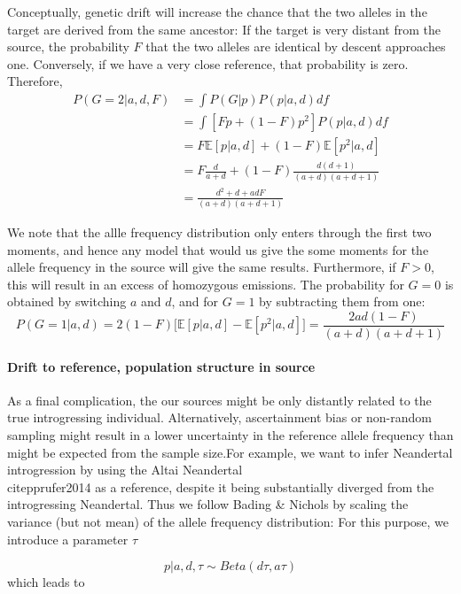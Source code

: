 \documentclass[10pt,a4paper]{article}
\newcommand{\BE}[1]{\mathbb{E}\left[#1\right]}
\begin{document}
Conceptually, genetic drift will increase the chance that the two alleles in the target are derived from the same ancestor: If the target is very distant from the source, the probability $F$ that the two alleles are identical by descent approaches one.  Conversely, if we have a very close reference, that probability is zero. Therefore,
\begin{align}
P(G=2 | a,d, F) &= \int P(G|p) P(p | a, d) df \nonumber\\
&= \int \left[ F p + (1-F) p^2\right] P(p | a, d) df\nonumber\\
&= F \BE{p|a, d} + (1-F)  \BE{p^2|a, d}\label{eq:pg}\\
&= F \frac{d}{a+d} + (1-F)  \frac{d (d+1)}{(a+d)(a+d+1)}\nonumber\\
&= \frac{d^2 + d + adF}{(a+d)(a+d+1)}
\end{align}


We note that the allle frequency distribution only enters through the first two moments, and hence any model that would us give the some moments for the allele frequency in the source will give the same results. Furthermore, if $F>0$, this will  result in an excess of homozygous emissions. The probability for $G=0$ is obtained by switching $a$ and $d$, and for $G=1$ by subtracting them from one:
\begin{equation}
P(G=1 | a,d) = 2(1-F) \bigg[\BE{p|a,d} - \BE{p^2 | a,d}\bigg] = \frac{2ad(1-F)}{(a+d)(a+d+1)}
\end{equation} 

\paragraph{Drift to reference, population structure in source}
As a final complication, the our sources might be only distantly related to the true introgressing individual. Alternatively, ascertainment bias or non-random sampling might result in a lower uncertainty in the reference allele frequency than might be expected from the sample size.For example, we want to infer Neandertal introgression by using the Altai Neandertal \\citep{prufer2014} as a reference, despite it being substantially diverged from the introgressing Neandertal. Thus we follow Bading \& Nichols by scaling the variance (but not mean) of the allele frequency distribution: For this purpose, we introduce a parameter $\tau$

\begin{equation}
p| a, d, \tau \sim Beta (d\tau, a\tau)
\end{equation}
which leads to
\end{document}
